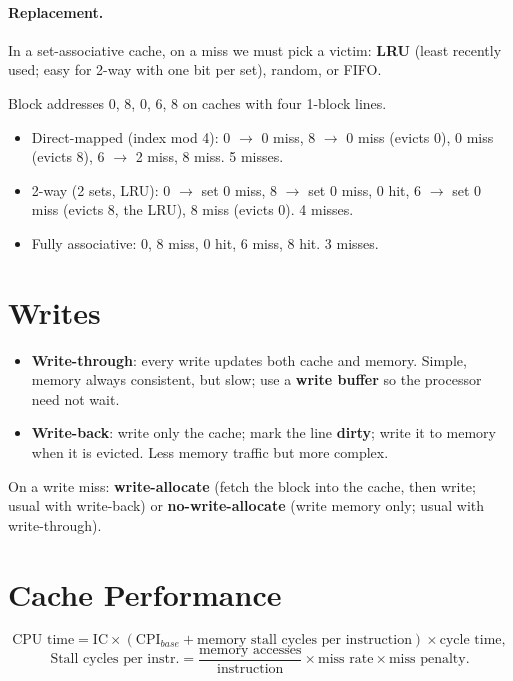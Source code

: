 \paragraph{Replacement.} In a set-associative cache, on a miss we must pick
a victim: \textbf{LRU} (least recently used; easy for 2-way with one bit per
set), random, or FIFO.

\begin{example}
Block addresses 0, 8, 0, 6, 8 on caches with four 1-block lines.
\begin{itemize}
  \item Direct-mapped (index mod 4): 0 $\to$ 0 miss, 8 $\to$ 0 miss
    (evicts 0), 0 miss (evicts 8), 6 $\to$ 2 miss, 8 miss. 5 misses.
  \item 2-way (2 sets, LRU): 0 $\to$ set 0 miss, 8 $\to$ set 0 miss,
    0 hit, 6 $\to$ set 0 miss (evicts 8, the LRU), 8 miss (evicts 0).
    4 misses.
  \item Fully associative: 0, 8 miss, 0 hit, 6 miss, 8 hit. 3 misses.
\end{itemize}
\end{example}

\section{Writes}

\begin{itemize}
  \item \textbf{Write-through}: every write updates both cache and memory.
    Simple, memory always consistent, but slow; use a \textbf{write buffer}
    so the processor need not wait.
  \item \textbf{Write-back}: write only the cache; mark the line
    \textbf{dirty}; write it to memory when it is evicted. Less memory
    traffic but more complex.
\end{itemize}
On a write miss: \textbf{write-allocate} (fetch the block into the cache,
then write; usual with write-back) or \textbf{no-write-allocate} (write
memory only; usual with write-through).

\section{Cache Performance}

\[
\text{CPU time} = \text{IC} \times (\text{CPI}_{base} + \text{memory stall
cycles per instruction}) \times \text{cycle time},
\]
\[
\text{Stall cycles per instr.} = \frac{\text{memory accesses}}{\text{instruction}}
\times \text{miss rate} \times \text{miss penalty}.
\]

